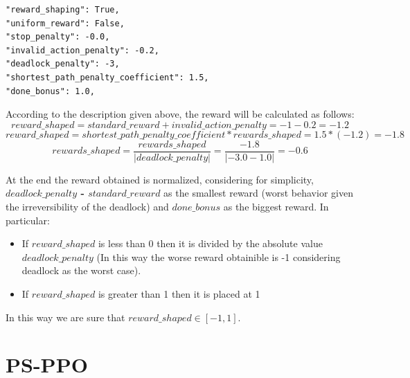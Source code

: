 \documentclass[11pt, a4paper, hidelinks]{report}
\begin{document}
\begin{lstlisting}[label={lst:rewards-params}]
"reward_shaping": True,
"uniform_reward": False,
"stop_penalty": -0.0,
"invalid_action_penalty": -0.2,
"deadlock_penalty": -3,
"shortest_path_penalty_coefficient": 1.5,
"done_bonus": 1.0,
\end{lstlisting}

According to the description given above, the reward will be calculated as follows:
\begin{equation*}
reward\_shaped = standard\_reward + invalid\_action\_penalty = -1 -0.2 = -1.2
\end{equation*}
\begin{equation*}
reward\_shaped = shortest\_path\_penalty\_coefficient * rewards\_shaped = 1.5 * (-1.2)= -1.8
\end{equation*}
\begin{equation*}
rewards\_shaped = \frac{rewards\_shaped}{|deadlock\_penalty|} = \frac{-1.8}{|-3.0 - 1.0|} = -0.6
\end{equation*}

At the end the reward obtained is normalized, considering for simplicity,  \textbf{$deadlock\_penalty$ - $standard\_reward$} as the smallest reward (worst behavior given the irreversibility of the deadlock) and \textbf{$done\_bonus$} as the biggest reward.
In particular:

\begin{itemize}
	\item If $reward\_shaped$ is less than 0 then it is divided by the absolute value $deadlock\_penalty$ (In this way the worse reward obtainible is -1 considering deadlock as the worst case).
	\item If $reward\_shaped$ is greater than 1 then it is placed at 1 
\end{itemize}

In this way we are sure that $reward\_shaped \in [-1, 1]$.

\section{PS-PPO}\label{sec:ps-ppo}
\end{document}
